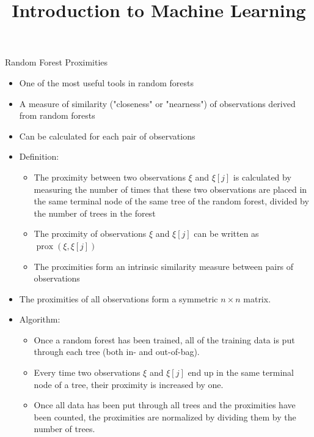 \documentclass[11pt,compress,t,notes=noshow, xcolor=table]{beamer}
\title{Introduction to Machine Learning}
\begin{document}



\begin{vbframe}{Random Forest Proximities}
\begin{itemize}
\item One of the most useful tools in random forests
\item A measure of similarity ("closeness" or "nearness") of observations derived from random forests
\item Can be calculated for each pair of observations
\item Definition:
\begin{itemize}
\item The proximity between two observations $\xi$ and $\xi[j]$ is calculated by measuring the number of times that these two observations are placed in the same terminal node of the same tree of the random forest, divided by the number of trees in the forest
\item The proximity of observations $\xi$ and $\xi[j]$ can be written as $\operatorname{prox}\left(\xi, \xi[j]\right)$
\item The proximities form an intrinsic similarity measure between pairs of observations
\end{itemize}
\item The proximities of all observations form a symmetric $n \times n$ matrix.
\framebreak 
% 

\item Algorithm:
\begin{itemize}
\item Once a random forest has been trained, all of the training data is put through each tree (both in- and out-of-bag).
\item Every time two observations $\xi$ and $\xi[j]$ end up in the same terminal node of a tree, their proximity is increased by one. 
\item Once all data has been put through all trees and the proximities have been counted, the proximities are normalized by dividing them by the number of trees.
\end{itemize}
\end{itemize}

\end{vbframe}
\end{document}
